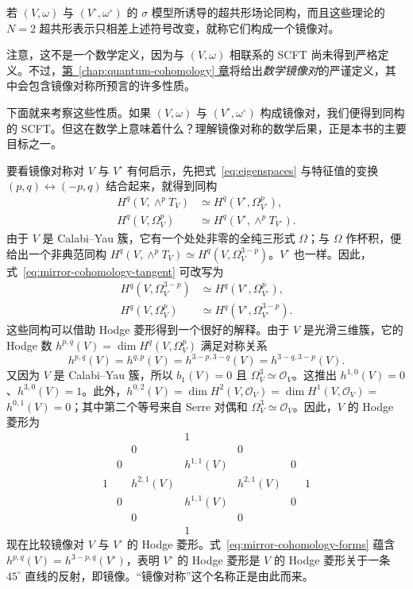 \begin{physicsdefinition}\label{def:physics-mirror-pair}
若 $(V,\omega)$ 与 $(V^\circ,\omega^\circ)$ 的 $\sigma$ 模型所诱导的超共形场论同构，而且这些理论的 $N=2$ 超共形表示只相差上述符号改变，就称它们构成一个镜像对。
\end{physicsdefinition}

注意，这不是一个数学定义，因为与 $(V,\omega)$ 相联系的 SCFT 尚未得到严格定义。不过，\hyperref[chap:quantum-cohomology]{第~\ref*{chap:quantum-cohomology} 章}将给出\emph{数学镜像对}的严谨定义，其中会包含镜像对称所预言的许多性质。

下面就来考察这些性质。如果 $(V,\omega)$ 与 $(V^\circ,\omega^\circ)$ 构成镜像对，我们便得到同构的 SCFT。但这在数学上意味着什么？理解镜像对称的数学后果，正是本书的主要目标之一。

要看镜像对称对 $V$ 与 $V^\circ$ 有何启示，先把式~\eqref{eq:eigenspaces} 与特征值的变换 $(p,q)\leftrightarrow(-p,q)$ 结合起来，就得到同构
\begin{equation}\label{eq:mirror-cohomology-tangent}
\begin{aligned}
H^q(V,\wedge^pT_V)&\simeq H^q(V^\circ,\Omega^p_{V^\circ}),\\
H^q(V,\Omega^p_V)&\simeq H^q(V^\circ,\wedge^pT_{V^\circ}).
\end{aligned}
\end{equation}
由于 $V$ 是 Calabi--Yau 簇，它有一个处处非零的全纯三形式 $\Omega$；与 $\Omega$ 作杯积，便给出一个非典范同构 $H^q(V,\wedge^pT_V)\simeq H^q(V,\Omega_V^{3-p})$。$V^\circ$ 也一样。因此，式~\eqref{eq:mirror-cohomology-tangent} 可改写为
\begin{equation}\label{eq:mirror-cohomology-forms}
\begin{aligned}
H^q(V,\Omega_V^{3-p})&\simeq H^q(V^\circ,\Omega_{V^\circ}^p),\\
H^q(V,\Omega_V^p)&\simeq H^q(V^\circ,\Omega_{V^\circ}^{3-p}).
\end{aligned}
\end{equation}
这些同构可以借助 Hodge 菱形得到一个很好的解释。由于 $V$ 是光滑三维簇，它的 Hodge 数 $h^{p,q}(V)=\dim H^q(V,\Omega_V^p)$ 满足对称关系
\[
h^{p,q}(V)=h^{q,p}(V)=h^{3-p,3-q}(V)=h^{3-q,3-p}(V).
\]
又因为 $V$ 是 Calabi--Yau 簇，所以 $b_1(V)=0$ 且 $\Omega_V^3\simeq\mathcal O_V$。这推出 $h^{1,0}(V)=0$、$h^{3,0}(V)=1$。此外，$h^{0,2}(V)=\dim H^2(V,\mathcal O_V)=\dim H^1(V,\mathcal O_V)=$
$h^{0,1}(V)=0$；其中第二个等号来自 Serre 对偶和 $\Omega_V^3\simeq\mathcal O_V$。因此，$V$ 的 Hodge 菱形为
\[
\begin{array}{ccccccc}
&&&1&&&\\
&&0&&0&&\\
&0&&h^{1,1}(V)&&0&\\
1&&h^{2,1}(V)&&h^{2,1}(V)&&1\\
&0&&h^{1,1}(V)&&0&\\
&&0&&0&&\\
&&&1&&&
\end{array}
\]
现在比较镜像对 $V$ 与 $V^\circ$ 的 Hodge 菱形。式~\eqref{eq:mirror-cohomology-forms} 蕴含 $h^{p,q}(V)=h^{3-p,q}(V^\circ)$，表明 $V^\circ$ 的 Hodge 菱形是 $V$ 的 Hodge 菱形关于一条 $45^\circ$ 直线的反射，即镜像。“镜像对称”这个名称正是由此而来。

